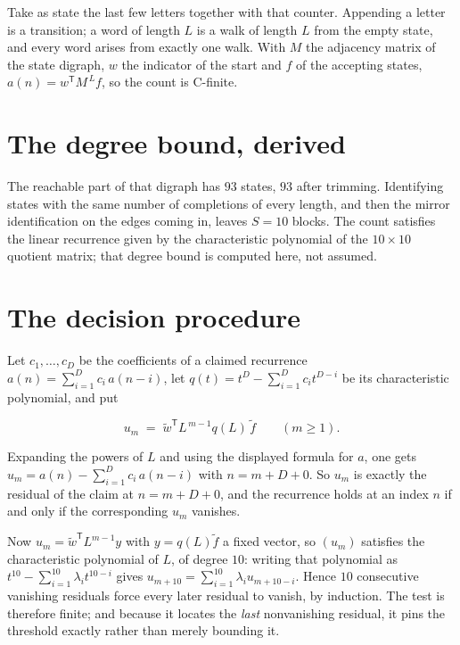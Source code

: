 \documentclass[11pt]{article}
\theoremstyle{definition}
\begin{document}
Take as state the last few letters together with that counter. Appending a letter is a transition; a word of length $L$ is a walk of length $L$ from the empty state, and every word arises from exactly one walk. With $M$ the adjacency matrix of the state digraph, $w$ the indicator of the start and $f$ of the accepting states, $a(n) = w^{\mathsf T}M^{\,L}f$, so the count is C-finite.

\section{The degree bound, derived}

The reachable part of that digraph has $93$ states, $93$ after trimming. Identifying states with the same number of completions of every length, and then the mirror identification on the edges coming in, leaves $S = 10$ blocks. The count satisfies the linear recurrence given by the characteristic polynomial of the $10\times10$ quotient matrix; that degree bound is computed here, not assumed.

\section{The decision procedure}

Let $c_1,\dots,c_D$ be the coefficients of a claimed recurrence $a(n) = \sum_{i=1}^{D} c_i\,a(n-i)$, let $q(t) = t^{D} - \sum_{i=1}^{D} c_i t^{D-i}$ be its characteristic polynomial, and put

\[u_m \;=\; \tilde w^{\mathsf T} L^{\,m-1} q(L)\,\tilde f \qquad (m \ge 1).\]

Expanding the powers of $L$ and using the displayed formula for $a$, one gets $u_m = a(n) - \sum_{i=1}^{D} c_i\,a(n-i)$ with $n = m + D + 0$. So $u_m$ is exactly the residual of the claim at $n = m + D + 0$, and the recurrence holds at an index $n$ if and only if the corresponding $u_m$ vanishes.

Now $u_m = \tilde w^{\mathsf T} L^{m-1} y$ with $y = q(L)\tilde f$ a fixed vector, so $(u_m)$ satisfies the characteristic polynomial of $L$, of degree $10$: writing that polynomial as $t^{10} - \sum_{i=1}^{10} \lambda_i t^{10-i}$ gives $u_{m+10} = \sum_{i=1}^{10} \lambda_i u_{m+10-i}$. Hence $10$ consecutive vanishing residuals force every later residual to vanish, by induction. The test is therefore finite; and because it locates the {\itshape last} nonvanishing residual, it pins the threshold exactly rather than merely bounding it.
\end{document}
